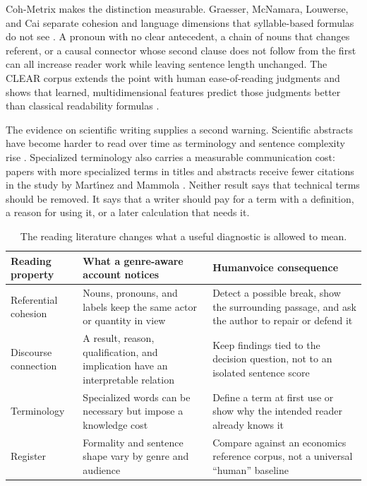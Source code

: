 Coh-Metrix makes the distinction measurable. Graesser, McNamara, Louwerse,
and Cai separate cohesion and language dimensions that syllable-based formulas
do not see \citep{graesser2004cohmetrix}. A pronoun with no clear antecedent,
a chain of nouns that changes referent, or a causal connector whose second
clause does not follow from the first can all increase reader work while
leaving sentence length unchanged. The CLEAR corpus extends the point with
human ease-of-reading judgments and shows that learned, multidimensional
features predict those judgments better than classical readability formulas
\citep{crossley2022clear}.

The evidence on scientific writing supplies a second warning. Scientific
abstracts have become harder to read over time as terminology and sentence
complexity rise \citep{plavensigray2017readability}. Specialized terminology
also carries a measurable communication cost: papers with more specialized
terms in titles and abstracts receive fewer citations in the study by
Mart\'{\i}nez and Mammola \citep{martinez2021terminology}. Neither result says
that technical terms should be removed. It says that a writer should pay for a
term with a definition, a reason for using it, or a later calculation that
needs it.

\begin{table}[H]
\centering
\small
\begin{tabularx}{\textwidth}{@{}p{}L p{0.27\textwidth}@{}}
\toprule
Reading property & What a genre-aware account notices & Humanvoice consequence \\
\midrule
Referential cohesion & Nouns, pronouns, and labels keep the same actor or
quantity in view & Detect a possible break, show the surrounding passage, and
ask the author to repair or defend it \\
Discourse connection & A result, reason, qualification, and implication have
an interpretable relation & Keep findings tied to the decision question, not
to an isolated sentence score \\
Terminology & Specialized words can be necessary but impose a knowledge cost &
Define a term at first use or show why the intended reader already knows it \\
Register & Formality and sentence shape vary by genre and audience & Compare
against an economics reference corpus, not a universal ``human'' baseline \\
\bottomrule
\end{tabularx}
\caption{The reading literature changes what a useful diagnostic is allowed to
mean.}
\label{tab:genre-consequences}
\end{table}

